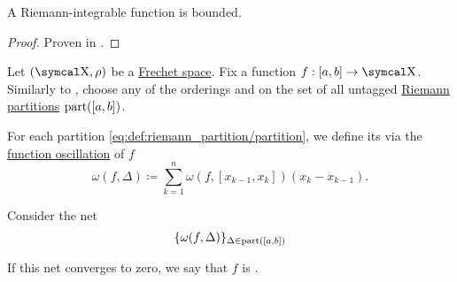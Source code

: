 \begin{corollary}\label{thm:riemann_integrable_implies_bounded}
  A Riemann-integrable function is bounded.
\end{corollary}
\begin{proof}
  Proven in .
\end{proof}

\begin{definition}\label{def:darboux_integrability}
  Let \( (\CX, \rho) \) be a \hyperref[def:frechet_space]{Frechet space}. Fix a function \( f: [a, b] \to \CX \). Similarly to , choose any of the orderings  and  on the set of all untagged \hyperref[def:riemann_partition/partition]{Riemann partitions} \( \operatorname{part}([a, b]) \).

  For each partition \eqref{eq:def:riemann_partition/partition}, we define its  via the \hyperref[def:function_oscillation]{function oscillation} of \( f \)
  \begin{equation}\label{eq:def:darboux_integrability/oscillation}
    \omega(f, \Delta) \coloneqq \sum_{k=1}^n \omega(f, [x_{k-1}, x_k]) (x_k - x_{k-1}).
  \end{equation}

  Consider the net
  \begin{equation}\label{eq:def:darboux_integrability/net}
    \{ \omega(f, \Delta) \}_{\Delta \in \operatorname{part}([a, b])}
  \end{equation}

  If this net converges to zero, we say that \( f \) is .
\end{definition}

